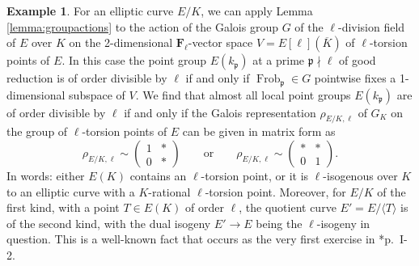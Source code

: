 \documentclass{amsart}
\theoremstyle{plain}
\theoremstyle{definition}
\newtheorem{example}[theorem]{Example}
\DeclareMathOperator{\Frob}{Frob}
\newcommand{\FF}{{\mathbf{F}}}
\newcommand{\gothp}{{\mathfrak{p}}}
\begin{document}
\begin{example}
\label{Serre-example}
For an elliptic curve $E/K$, we can 
apply Lemma \ref{lemma:groupactions} to the action 
of the Galois group $G$ of the $\ell$-division field 
of $E$ over $K$ on the 2-dimensional $\FF_\ell$-vector space
$V=E[\ell](\overline K)$ of $\ell$-torsion points of $E$.
In this case the point group $E(k_\gothp)$ at a prime 
$\gothp\nmid \ell$ of good reduction is of order divisible 
by $\ell$ if and only if $\Frob_\gothp\in G$ 
pointwise fixes a 1-dimensional subspace of $V$.
We find that almost all local point groups $E(k_\gothp)$ are 
of order divisible by $\ell$ if and only if the 
Galois representation $\rho_{E/K,\ell}$ of $G_K$ 
on the group of $\ell$-torsion points of $E$ 
can be given in matrix form as 
\[
\rho_{E/K,\ell} \sim 
\begin{pmatrix}
1 & *  \\
0 & *  
\end{pmatrix}
\qquad\text{or}\qquad
\rho_{E/K,\ell} \sim 
\begin{pmatrix}
* & *  \\
0 & 1  
\end{pmatrix}.
\]
In words: either $E(K)$ contains an $\ell$-torsion point,
or it is $\ell$-isogenous over $K$ to an elliptic curve 
with a $K$-rational $\ell$-torsion point. 
Moreover, for $E/K$ of the first kind, with a point $T\in E(K)$ of order $\ell$,
the quotient curve $E'=E/\langle T\rangle$ is of the second kind, with
the dual isogeny $E'\to E$ being the $\ell$-isogeny in question.
This is a well-known fact that occurs as the very first exercise  
in \cite{Serre2}*{p.\ I-2}.
\end{example}
\end{document}
